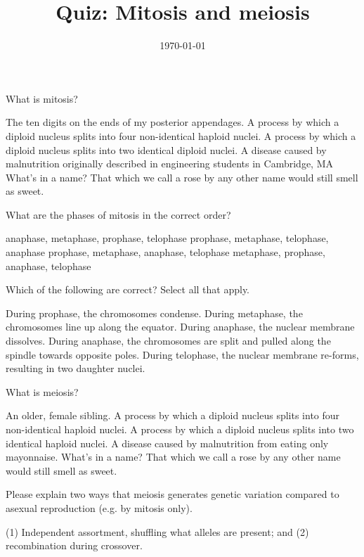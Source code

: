 \documentclass[hw,addpoints,noanswers]{exam}
\title{Quiz: Mitosis and meiosis}
\author{\mobeardInstructorShort}
\date{\today}
\begin{document}
\maketitle

\begin{questions}
\question[1] What is mitosis? 
\begin{choices}
\choice The ten digits on the ends of my posterior appendages. 
\choice A process by which a diploid nucleus splits into four non-identical haploid nuclei.
\CorrectChoice A process by which a diploid nucleus splits into two identical diploid nuclei. 
\choice A disease caused by malnutrition originally described in engineering students in Cambridge, MA
\choice What's in a name? That which we call a rose by any other name would still smell as sweet. 
\end{choices}

\question[1] What are the phases of mitosis in the correct order?
\begin{choices}
\choice anaphase, metaphase, prophase, telophase
\choice prophase, metaphase, telophase, anaphase
\CorrectChoice prophase, metaphase, anaphase, telophase
\choice metaphase, prophase, anaphase, telophase
\end{choices}

\question[1] Which of the following are correct? Select all that apply.
\begin{choices}
\CorrectChoice During prophase, the chromosomes condense. 
\CorrectChoice During metaphase, the chromosomes line up along the equator.
\CorrectChoice During anaphase, the nuclear membrane dissolves.
\CorrectChoice During anaphase, the chromosomes are split and pulled along the spindle towards opposite poles.
\CorrectChoice During telophase, the nuclear membrane re-forms, resulting in two daughter nuclei.
\end{choices}

\question[1] What is meiosis? 
\begin{choices}
\choice An older, female sibling. 
\CorrectChoice A process by which a diploid nucleus splits into four non-identical haploid nuclei.
\choice A process by which a diploid nucleus splits into two identical haploid nuclei. 
\choice A disease caused by malnutrition from eating only mayonnaise. 
\choice What's in a name? That which we call a rose by any other name would still smell as sweet. 
\end{choices}

\question[1] Please explain two ways that meiosis generates genetic variation compared to asexual reproduction (e.g. by mitosis only). 
\begin{solution}
(1) Independent assortment, shuffling what alleles are present; and (2) recombination during crossover. 
\end{solution}
\end{questions}
\end{document}
